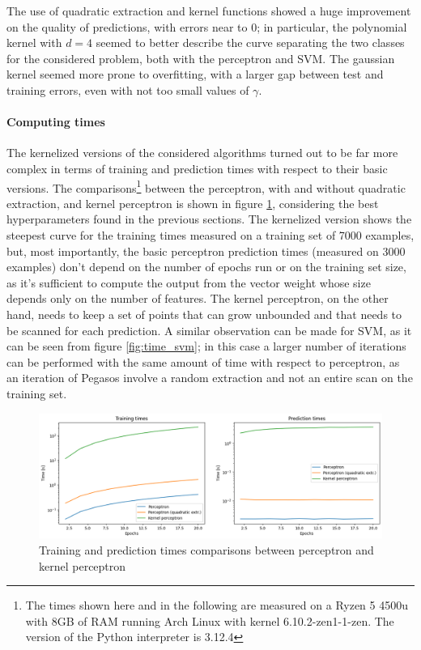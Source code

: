 \documentclass{article}
\begin{document}
The use of quadratic extraction and kernel functions showed a huge improvement on the quality of predictions, with errors near to 0; in particular, the polynomial kernel with $d=4$ seemed to better describe the curve separating the two classes for the considered problem, both with the perceptron and SVM. The gaussian kernel seemed more prone to overfitting, with a larger gap between test and training errors, even with not too small values of $\gamma$. 

\paragraph{Computing times}
The kernelized versions of the considered algorithms turned out to be far more complex in terms of training and prediction times with respect to their basic versions. The comparisons\footnote{The times shown here and in the following are measured on a Ryzen 5 4500u with 8GB of RAM running Arch Linux with kernel 6.10.2-zen1-1-zen. The version of the Python interpreter is 3.12.4} between the perceptron, with and without quadratic extraction, and kernel perceptron is shown in figure \ref{fig:time_perceptron}, considering the best hyperparameters found in the previous sections.
The kernelized version shows the steepest curve for the training times measured on a training set of 7000 examples, but, most importantly, the basic perceptron prediction times (measured on 3000 examples) don't depend on the number of epochs run or on the training set size, as it's sufficient to compute the output from the vector weight whose size depends only on the number of features. The kernel perceptron, on the other hand, needs to keep a set of points that can grow unbounded and that needs to be scanned for each prediction.
A similar observation can be made for SVM, as it can be seen from figure \ref{fig:time_svm}; in this case a larger number of iterations can be performed with the same amount of time with respect to perceptron, as an iteration of Pegasos involve a random extraction and not an entire scan on the training set.
\begin{figure}
	\centering
	\includegraphics[width=\columnwidth]{../plots/time_perceptron.png}
	\caption{Training and prediction times comparisons between perceptron and kernel perceptron}
	\label{fig:time_perceptron}
\end{figure}
\end{document}
